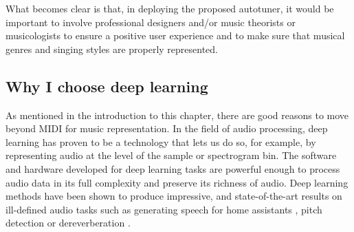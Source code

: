 What becomes clear is that, in deploying the proposed autotuner, it would be important to involve professional designers and/or music theorists or musicologists to ensure a positive user experience and to make sure that musical genres and singing styles are properly represented.

\subsection{Why I choose deep learning}
As mentioned in the introduction to this chapter, there are good reasons to move beyond MIDI for music representation. In the field of audio processing, deep learning has proven to be a technology that lets us do so, for example, by representing audio at the level of the sample or spectrogram bin. The software and hardware developed for deep learning tasks are powerful enough to process audio data in its full complexity and preserve its richness of audio. Deep learning methods have been shown to produce impressive, and state-of-the-art results on ill-defined audio tasks such as generating speech for home assistants \cite{oord2016wavenet}, pitch detection \cite{bittner2017deep} or dereverberation \cite{su2020hifi}. 